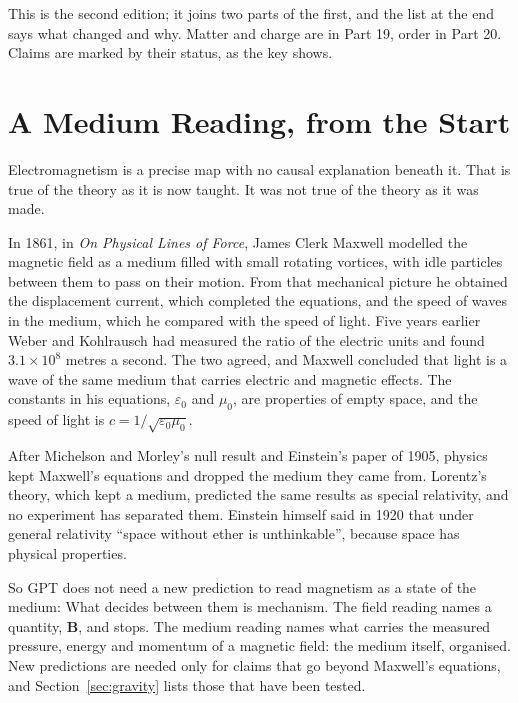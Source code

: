 \documentclass[11pt,a4paper]{article}
\begin{document}
This is the second edition; it joins two parts of the first, and the list at the end says what changed and why. Matter and charge are in Part 19, order in Part 20. Claims are marked by their status, as the key shows.

\statuskey

\section{A Medium Reading, from the Start}
\label{sec:maxwell}

Electromagnetism is a precise map with no causal explanation beneath it. That is true of the theory as it is now taught. It was not true of the theory as it was made.

 In 1861, in \emph{On Physical Lines of Force}, James Clerk Maxwell modelled the magnetic field as a medium filled with small rotating vortices, with idle particles between them to pass on their motion. From that mechanical picture he obtained the displacement current, which completed the equations, and the speed of waves in the medium, which he compared with the speed of light. Five years earlier Weber and Kohlrausch had measured the ratio of the electric units and found $3.1\times10^{8}$ metres a second. The two agreed, and Maxwell concluded that light is a wave of the same medium that carries electric and magnetic effects. The constants in his equations, $\varepsilon_0$ and $\mu_0$, are properties of empty space, and the speed of light is $c=1/\sqrt{\varepsilon_0\mu_0}$.

 After Michelson and Morley's null result and Einstein's paper of 1905, physics kept Maxwell's equations and dropped the medium they came from. Lorentz's theory, which kept a medium, predicted the same results as special relativity, and no experiment has separated them. Einstein himself said in 1920 that under general relativity ``space without ether is unthinkable'', because space has physical properties.

So GPT does not need a new prediction to read magnetism as a state of the medium:  What decides between them is mechanism. The field reading names a quantity, $\mathbf{B}$, and stops. The medium reading names what carries the measured pressure, energy and momentum of a magnetic field: the medium itself, organised. New predictions are needed only for claims that go beyond Maxwell's equations, and Section~\ref{sec:gravity} lists those that have been tested.
\end{document}
